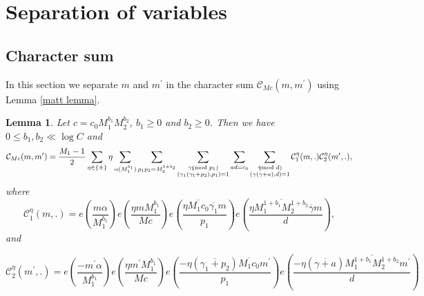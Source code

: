 \documentclass[12pt,a4paper,twoside, reqno]{amsart}
\newcommand{\shortmod}{\ensuremath{\negthickspace \negthickspace \negthickspace \pmod}}
\newcommand{\e}[2]{e\left(\frac{#1}{#2}\right)}
\newtheorem{lemma}{Lemma}
\begin{document}
\section{Separation of variables}

\subsection{Character sum}
In this section we separate $m$ and $m^\prime$ in the  character sum $  \mathcal{C}_{Mc}(m,m^\prime)$  using Lemma \ref{matt lemma}. 
\begin{lemma} \label{separ of char}
Let $c=c_0 M_1^{b_1} M_2^{b_2}$, $b_1 \geq 0$ and $ b_2 \geq 0$. Then we have  $0\leq b_1, b_2 \ll \log C$ and  
\begin{align}
        \mathcal{C}_{Mc}(m,m^\prime)= \frac{M_1-1}{2} \sum_{\eta \in \{\pm\} }\eta  \mathop{\sum}_{\substack{\alpha (M_1^{b_1})  }} \sum_{p_1p_2=M_2^{1+b_2}} \sum_{\substack{\gamma_1 \shortmod{p_1} \\ (\gamma_1(\gamma_1+p_2),p_1)=1}} \sum_{ad=c_0}\sum_{\substack{\gamma \shortmod{d} \\ (\gamma(\gamma+a),d)=1}}  \mathcal{C}_1^{\eta}(m, . ) \mathcal{C}_2^{\eta}(m^\prime, .) ,
    \end{align}
    where 
    \[ \mathcal{C}_1^{\eta}(m, . ) = e\left(\frac{   m \alpha}{M_1^{b_1}} \right) e\left(\frac{\eta m M_1^{b_1}}{Mc }   \right) \e{\eta \overline{M_1c_0} \overline{\gamma_1} m} {p_1}  \e{\eta \overline{M_1^{1+b_1}M_2^{1+b_2} } \overline{\gamma} m }{d}, \]
and 
    
     \[ \mathcal{C}_2^{\eta}(m^\prime, . ) = e\left(\frac{   - m^\prime \alpha}{M_1^{b_1}} \right) e\left(\frac{\eta m^\prime M_1^{b_1}}{Mc }   \right) \e{- \eta (\overline{\gamma_1+p_2})  \overline{M_1c_0} m^\prime}{p_1}  \e{ - \eta (\overline{\gamma+a})  \overline{M_1^{1+b_1} M_2^{1+b_2}} m^\prime}{d}    \]

\end{lemma}
\end{document}
